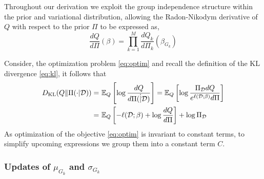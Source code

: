 \documentclass[12pt]{article}
\begin{document}
Throughout our derivation we exploit the group independence structure within the prior and variational distribution, allowing the Radon-Nikodym derivative of $Q$ with respect to the prior $\Pi$ to be expressed as,
\begin{equation}
    \frac{dQ}{d\Pi}(\beta) = \prod_{k=1}^{M} \frac{dQ_k}{d\Pi_k} (\beta_{G_k})
\end{equation}

Consider, the optimization problem \eqref{eq:optim} and recall the definition of the KL divergence \eqref{eq:kl}, it follows that
\begin{align}
    D_\text{KL}(Q \| \Pi(\cdot | \mathcal{D})) 
    = &\ \mathbb{E}_{Q} \left[ \log \frac{dQ}{d\Pi(\dot | \mathcal{D})} \right] 
    = \mathbb{E}_Q \left[ \log \frac{\Pi_{\mathcal{D}} dQ}{e^{\ell(\mathcal{D}; \beta)} d\Pi} \right] \nonumber \\
    =&\ \mathbb{E}_Q \left[ -\ell(\mathcal{D}; \beta) + \log \frac{dQ}{d\Pi} \right] + \log \Pi_{\mathcal{D}}
\end{align}
As optimization of the objective \eqref{eq:optim} is invariant to constant terms, to simplify upcoming expressions we group them into a constant term $C$.

\subsubsection{Updates of $\mu_{G_k}$ and $\sigma_{G_k}$}
\end{document}
